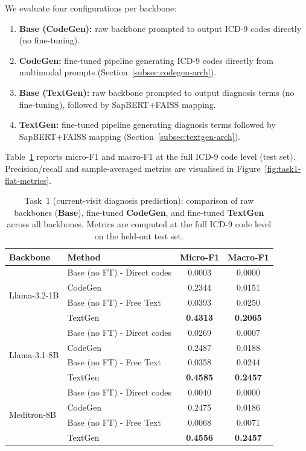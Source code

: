 We evaluate four configurations per backbone:
\begin{enumerate}
    \item \textbf{Base (CodeGen):} raw backbone prompted to output ICD-9 codes directly (no fine-tuning).
    \item \textbf{CodeGen:} fine-tuned pipeline generating ICD-9 codes directly from multimodal prompts (Section~\ref{subsec:codegen-arch}).
    \item \textbf{Base (TextGen):} raw backbone prompted to output diagnosis terms (no fine-tuning), followed by SapBERT+FAISS mapping.
    \item \textbf{TextGen:} fine-tuned pipeline generating diagnosis terms followed by SapBERT+FAISS mapping (Section~\ref{subsec:textgen-arch}).
\end{enumerate}

Table~\ref{tab:task1-all-methods-flat} reports micro-F1 and macro-F1 at the full ICD-9 code level (test set). Precision/recall and sample-averaged metrics are visualised in Figure~\ref{fig:task1-flat-metrics}.

\begin{table}[t]
    \centering
    \caption{Task~1 (current-visit diagnosis prediction): comparison of raw backbones (\textbf{Base}), fine-tuned \textbf{CodeGen}, and fine-tuned \textbf{TextGen} across all backbones. Metrics are computed at the full ICD-9 code level on the held-out test set.}
    \label{tab:task1-all-methods-flat}
    \begin{tabular}{llcc}
        \toprule
        \textbf{Backbone} & \textbf{Method} &
        \textbf{Micro-F1} & \textbf{Macro-F1} \\
        \midrule
        \multirow{4}{*}{Llama-3.2-1B} 
            & Base (no FT) - Direct codes  & 0.0003 & 0.0000 \\
            & CodeGen        & 0.2344 & 0.0151 \\
            & Base (no FT) - Free Text  & 0.0393 & 0.0250 \\
            & TextGen        & \textbf{0.4313} & \textbf{0.2065} \\
        \midrule
        \multirow{4}{*}{Llama-3.1-8B} 
            & Base (no FT) - Direct codes  & 0.0269 & 0.0007 \\
            & CodeGen        & 0.2487 & 0.0188 \\
            & Base (no FT) - Free Text  & 0.0358 & 0.0244 \\
            & TextGen        & \textbf{0.4585} & \textbf{0.2457} \\
        \midrule
        \multirow{4}{*}{Meditron-8B} 
            & Base (no FT) - Direct codes  & 0.0040 & 0.0000 \\
            & CodeGen        & 0.2475 & 0.0186 \\
            & Base (no FT) - Free Text  & 0.0068 & 0.0071 \\
            & TextGen        & \textbf{0.4556} & \textbf{0.2457} \\
        \bottomrule
    \end{tabular}
\end{table}

